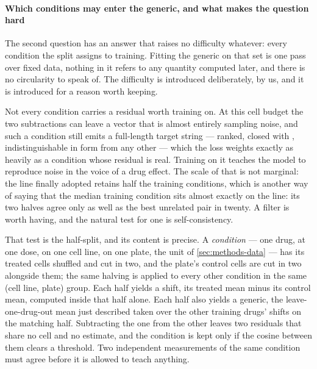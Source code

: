 \paragraph{Which conditions may enter the generic, and what makes the question
hard} The second question has an answer that raises no difficulty whatever: every
condition the split assigns to training. Fitting the generic on that set is one
pass over fixed data, nothing in it refers to any quantity computed later, and
there is no circularity to speak of. The difficulty is introduced deliberately,
by us, and it is introduced for a reason worth keeping.

Not every condition carries a residual worth training on. At this cell budget the
two subtractions can leave a vector that is almost entirely sampling noise, and
such a condition still emits a full-length target string --- ranked, closed with
\ENDCELL{}, indistinguishable in form from any other --- which the loss weights
exactly as heavily as a condition whose residual is real. Training on it teaches
the model to reproduce noise in the voice of a drug effect. The scale of that is
not marginal: the line finally adopted retains half the training conditions, which is another way of saying that the median training condition sits almost exactly on the line: its two halves agree only as well as the best unrelated pair in twenty. A filter is worth having, and the
natural test for one is self-consistency.

That test is the half-split, and its content is precise. A \emph{condition} ---
one drug, at one dose, on one cell line, on one plate, the unit of
\cref{sec:methods-data} --- has its treated cells shuffled and cut in two, and the
plate's control cells are cut in two alongside them; the same halving is applied
to every other condition in the same (cell line, plate) group. Each half yields a
shift, its treated mean minus its control mean, computed inside that half alone.
Each half also yields a generic, the leave-one-drug-out mean just described taken
over the other training drugs' shifts on the matching half. Subtracting the one
from the other leaves two residuals that share no cell and no estimate, and the
condition is kept only if the cosine between them clears a threshold. Two
independent measurements of the same condition must agree before it is allowed to
teach anything.

